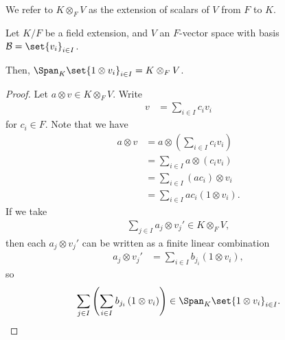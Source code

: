 \documentclass[10pt]{mypackage}
\begin{document}
  We refer to $K\otimes_{F}V$ as the extension of scalars of $V$ from $F$ to $K$.
  \begin{proposition}
    Let $K/F$ be a field extension, and $V$ an $F$-vector space with basis $\mathcal{B} = \set{v_i}_{i\in I}$.\newline

    Then, $\Span_{K}\set{1\otimes v_i}_{i\in I} = K\otimes_{F}V$.
  \end{proposition}
  \begin{proof}
    Let $a\otimes v\in K\otimes_{F}V$. Write
    \begin{align*}
      v &= \sum_{i\in I}c_i v_i
    \end{align*}
    for $c_i\in F$. Note that we have
    \begin{align*}
      a\otimes v &= a\otimes \left(\sum_{i\in I}c_iv_i\right)\\
                 &= \sum_{i\in I}a\otimes \left(c_iv_i\right)\\
                 &= \sum_{i\in I}\left(ac_i\right)\otimes v_i\\
                 &= \sum_{i\in I}ac_i\left(1\otimes v_i\right).
    \end{align*}
    If we take
    \begin{align*}
      \sum_{j\in I}a_j\otimes v_j' \in K\otimes_{F}V,
    \end{align*}
    then each $a_j\otimes v_j'$ can be written as a finite linear combination
    \begin{align*}
      a_j\otimes v_j'&= \sum_{i\in I}b_{j_i}\left(1\otimes v_i\right),
    \end{align*}
    so
    \begin{align*}
      \sum_{j\in I}\left(\sum_{i\in I}b_{j_i}\left(1\otimes v_i\right)\right)\in \Span_{K}\set{1\otimes v_i}_{i\in I}.
    \end{align*}
  \end{proof}
\end{document}
